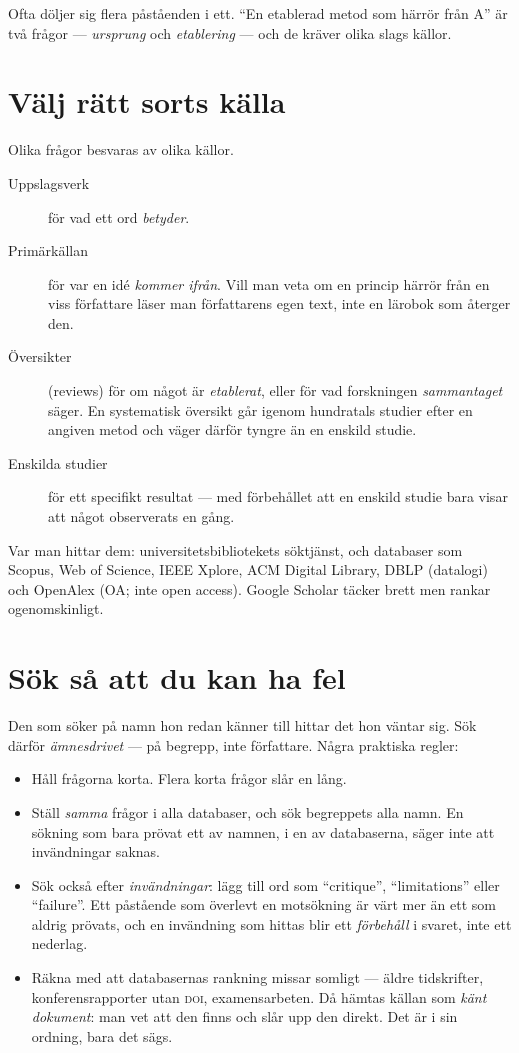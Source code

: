 Ofta döljer sig flera påståenden i ett.  \enquote{En etablerad metod som
härrör från A} är två frågor --- \emph{ursprung} och \emph{etablering}
--- och de kräver olika slags källor.

\section{Välj rätt sorts källa}

Olika frågor besvaras av olika källor.
\begin{description}
  \item[Uppslagsverk] för vad ett ord \emph{betyder}.
  \item[Primärkällan] för var en idé \emph{kommer ifrån}.  Vill man veta
    om en princip härrör från en viss författare läser man författarens
    egen text, inte en lärobok som återger den.
  \item[Översikter] (\foreignlanguage{english}{reviews}) för om något är
    \emph{etablerat}, eller för vad forskningen \emph{sammantaget}
    säger.  En systematisk översikt går igenom hundratals studier efter
    en angiven metod och väger därför tyngre än en enskild studie.
  \item[Enskilda studier] för ett specifikt resultat --- med förbehållet
    att en enskild studie bara visar att något observerats en gång.
\end{description}
Var man hittar dem: universitetsbibliotekets söktjänst, och databaser som
Scopus, Web of Science, IEEE Xplore, ACM Digital Library, DBLP (datalogi)
och OpenAlex (OA; inte \foreignlanguage{english}{open access}).  Google
Scholar täcker brett men rankar ogenomskinligt.

\section{Sök så att du kan ha fel}

Den som söker på namn hon redan känner till hittar det hon väntar sig.
Sök därför \emph{ämnesdrivet} --- på begrepp, inte författare.  Några
praktiska regler:
\begin{itemize}
  \item Håll frågorna korta.  Flera korta frågor slår en lång.
  \item Ställ \emph{samma} frågor i alla databaser, och sök begreppets
    alla namn.  En sökning som bara prövat ett av namnen, i en av
    databaserna, säger inte att invändningar saknas.
  \item Sök också efter \emph{invändningar}: lägg till ord som
    \enquote{critique}, \enquote{limitations} eller \enquote{failure}.
    Ett påstående som överlevt en motsökning är värt mer än ett som
    aldrig prövats, och en invändning som hittas blir ett
    \emph{förbehåll} i svaret, inte ett nederlag.
  \item Räkna med att databasernas rankning missar somligt --- äldre
    tidskrifter, konferensrapporter utan \textsc{doi}, examensarbeten.
    Då hämtas källan som \emph{känt dokument}: man vet att den finns och
    slår upp den direkt.  Det är i sin ordning, bara det sägs.
\end{itemize}

